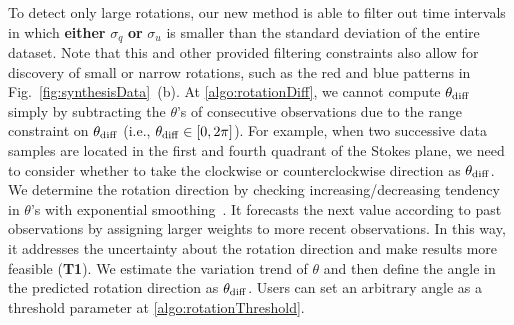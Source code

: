 %
To detect only large rotations, 
our new method is able to filter out time intervals in which \textbf{either} $\sigma_{q}$ \textbf{or} $ \sigma_{u}$ is smaller than the standard deviation of the entire dataset. %
Note that this and other provided filtering constraints also allow for discovery of small or narrow rotations, such as the red and blue patterns in Fig.~\ref{fig:synthesisData}~(b).
%
At \ref{algo:rotationDiff}, we cannot compute $\theta_{\rm diff}$ simply by subtracting the $\theta$'s of consecutive observations 
due to the range constraint on $\theta_{\rm diff}$ (i.e., $\theta_{\rm diff} \in [0, 2\pi]$). 
For example, when two successive data samples are located in the first and fourth quadrant of the Stokes plane, 
we need to consider whether to take the clockwise or counterclockwise direction as $\theta_{\rm diff}$. 
We determine the rotation direction 
by checking increasing/decreasing tendency in $\theta$'s with exponential smoothing~\cite{Brown1956}.
It forecasts the next value according to past observations by assigning larger weights to more recent observations.
In this way, it addresses the uncertainty about the rotation direction and make results more feasible (\textbf{T1}).
We estimate the variation trend of $\theta$ and
then define the angle in the predicted rotation direction as $\theta_{\rm diff}$.
Users can set an arbitrary angle as a threshold parameter at \ref{algo:rotationThreshold}.

